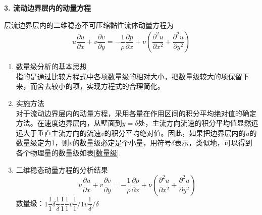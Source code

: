 \noindent \textbf{3. 流动边界层内的动量方程}

层流边界层内的二维稳态不可压缩黏性流体动量方程为
\begin{align}
	u\dfrac{\partial u}{\partial x} + v \dfrac{\partial v}{\partial y} = - \dfrac{1}{\rho} \dfrac{\partial p}{\partial x} + \nu \left(\dfrac{\partial^2 u}{\partial x^2} + \dfrac{\partial^2 u}{\partial y^2}\right)
\end{align}
\begin{enumerate}[\hspace*{2em} (1)]
	\item 数量级分析的基本思想\\
	指的是通过比较方程式中各项数量级的相对大小，把数量级较大的项保留下来，而舍去较小的项，实现方程式的合理简化。
	\item 实施方法\\
	对于流动边界层内的动量方程，采用各量在作用区间的积分平均绝对值的确定方法。在速度边界层内，从壁面到$y = \delta $处，主流方向流速的积分平均值显然远远大于垂直主流方向的流速$v$的积分平均绝对值。因此，如果把边界层内的$u$的数量级定为1，则$v$的数量级必定是个小量，用符号$\delta $表示，类似地，可以得到各个物理量的数量级如表\ref{数量级}.
	\begin{table}[!htb]
		\centering
		\caption{温度边界层中物理量的数量级}
		\label{数量级}
	\end{table}
	
	\item 二维稳态动量方程的分析结果
	\begin{equation}
		u\dfrac{\partial u}{\partial x} + v \dfrac{\partial v}{\partial y} = - \dfrac{1}{\rho} \dfrac{\partial p}{\partial x} + \nu \left(\dfrac{\partial^2 u}{\partial x^2} + \dfrac{\partial^2 u}{\partial y^2}\right)
	\end{equation}
	数量级：\hspace*{3.7cm}$1\dfrac{1}{1}$\hspace*{0.6cm}$\delta \dfrac{1}{\delta}$\hspace*{0.8cm}$\dfrac{1}{1}\dfrac{1}{1}$\hspace*{0.6cm}$v\dfrac{1}{1}\Big/1$\hspace*{0.3cm}$v\dfrac{1}{\delta}\Big/ \delta$
	

\end{enumerate}
